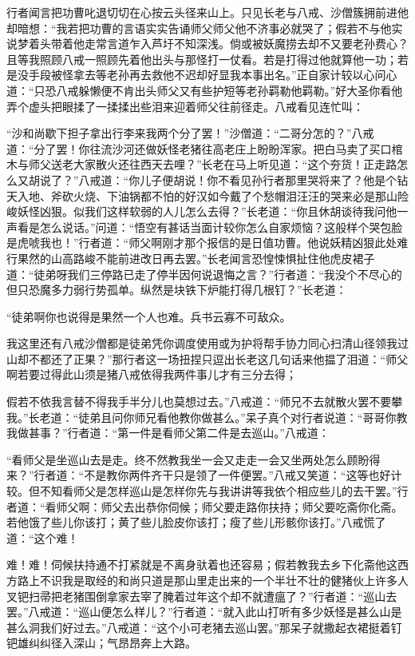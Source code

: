 \documentclass[12pt,UTF8]{ctexbook}
\begin{document}
行者闻言把功曹叱退切切在心按云头径来山上。只见长老与八戒、沙僧簇拥前进他却暗想：“我若把功曹的言语实实告诵师父师父他不济事必就哭了；假若不与他实说梦着头带着他走常言道乍入芦圩不知深浅。倘或被妖魔捞去却不又要老孙费心？且等我照顾八戒一照顾先着他出头与那怪打一仗看。若是打得过他就算他一功；若是没手段被怪拿去等老孙再去救他不迟却好显我本事出名。”正自家计较以心问心道：“只恐八戒躲懒便不肯出头师父又有些护短等老孙羁勒他羁勒。”好大圣你看他弄个虚头把眼揉了一揉揉出些泪来迎着师父往前径走。八戒看见连忙叫：

“沙和尚歇下担子拿出行李来我两个分了罢！”沙僧道：“二哥分怎的？”八戒道：“分了罢！你往流沙河还做妖怪老猪往高老庄上盼盼浑家。把白马卖了买口棺木与师父送老大家散火还往西天去哩？”长老在马上听见道：“这个夯货！正走路怎么又胡说了？”八戒道：“你儿子便胡说！你不看见孙行者那里哭将来了？他是个钻天入地、斧砍火烧、下油锅都不怕的好汉如今戴了个愁帽泪汪汪的哭来必是那山险峻妖怪凶狠。似我们这样软弱的人儿怎么去得？”长老道：“你且休胡谈待我问他一声看是怎么说话。”问道：“悟空有甚话当面计较你怎么自家烦恼？这般样个哭包脸是虎唬我也！”行者道：“师父啊刚才那个报信的是日值功曹。他说妖精凶狠此处难行果然的山高路峻不能前进改日再去罢。”长老闻言恐惶悚惧扯住他虎皮裙子道：“徒弟呀我们三停路已走了停半因何说退悔之言？”行者道：“我没个不尽心的但只恐魔多力弱行势孤单。纵然是块铁下炉能打得几根钉？”长老道：

“徒弟啊你也说得是果然一个人也难。兵书云寡不可敌众。

我这里还有八戒沙僧都是徒弟凭你调度使用或为护将帮手协力同心扫清山径领我过山却不都还了正果？”那行者这一场扭捏只逗出长老这几句话来他揾了泪道：“师父啊若要过得此山须是猪八戒依得我两件事儿才有三分去得；

假若不依我言替不得我手半分儿也莫想过去。”八戒道：“师兄不去就散火罢不要攀我。”长老道：“徒弟且问你师兄看他教你做甚么。”呆子真个对行者说道：“哥哥你教我做甚事？”行者道：“第一件是看师父第二件是去巡山。”八戒道：

“看师父是坐巡山去是走。终不然教我坐一会又走走一会又坐两处怎么顾盼得来？”行者道：“不是教你两件齐干只是领了一件便罢。”八戒又笑道：“这等也好计较。但不知看师父是怎样巡山是怎样你先与我讲讲等我依个相应些儿的去干罢。”行者道：“看师父啊：师父去出恭你伺候；师父要走路你扶持；师父要吃斋你化斋。若他饿了些儿你该打；黄了些儿脸皮你该打；瘦了些儿形骸你该打。”八戒慌了道：“这个难！

难！难！伺候扶持通不打紧就是不离身驮着也还容易；假若教我去乡下化斋他这西方路上不识我是取经的和尚只道是那山里走出来的一个半壮不壮的健猪伙上许多人叉钯扫帚把老猪围倒拿家去宰了腌着过年这个却不就遭瘟了？”行者道：“巡山去罢。”八戒道：“巡山便怎么样儿？”行者道：“就入此山打听有多少妖怪是甚么山是甚么洞我们好过去。”八戒道：“这个小可老猪去巡山罢。”那呆子就撒起衣裙挺着钉钯雄纠纠径入深山；气昂昂奔上大路。
\end{document}
